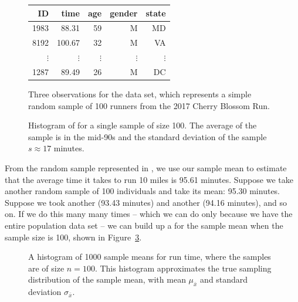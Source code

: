 \begin{figure}[h]
\centering
\begin{tabular}{rrrrr}
  \hline
ID & time & age & gender & state \\ 
  \hline
1983 & 88.31 & 59 & M & MD \\ 
8192 & 100.67 & 32 & M & VA \\ 
  $\vdots$ &   $\vdots$ &   $\vdots$ &   $\vdots$ &   $\vdots$ \\ 
1287 & 89.49 & 26 & M & DC \\ 
   \hline
\end{tabular}
\caption{Three observations for the  data set, which represents a simple random sample of 100 runners from the 2017 Cherry Blossom Run.}
\label{run17sampDF}
\end{figure}

\begin{figure}[h]
\centering
\caption{Histogram of  for a single sample of size 100. The average of the sample is in the mid-90s and the standard deviation of the sample $s\approx 17$ minutes.
}
\label{run17sampHistograms}
\end{figure}



From the random sample represented in , we use our sample mean to estimate that the average time it takes to run 10 miles is 95.61 minutes. Suppose we take another random sample of 100 individuals and take its mean: 95.30 minutes. Suppose we took another (93.43 minutes) and another (94.16 minutes), and so on. If we do this many many times -- which we can do only because we have the entire population data set -- we can build up a  for the sample mean when the sample size is 100, shown in Figure~\ref{netTime1000SamplingDistribution}.

\newpage
\begin{figure}[h]
   \centering
{}
   \caption{A histogram of 1000 sample means for run time, where the samples are of size $n=100$. This histogram approximates the true sampling distribution of the sample mean, with mean $\mu_{\bar{x}}$ and standard deviation $\sigma_{\bar{x}}$.}
   \label{netTime1000SamplingDistribution}
\end{figure}

